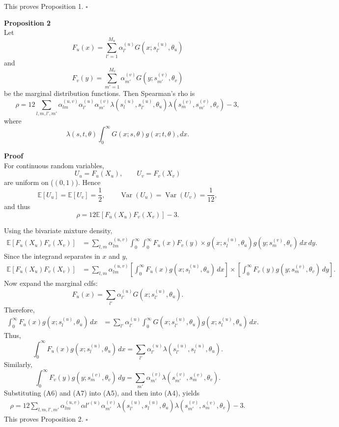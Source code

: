 \documentclass[11pt]{article}
\begin{document}
This proves Proposition 1. $\square$

\textbf{Proposition 2}\\

Let 
\[ F_u(x) = \sum_{l'=1}^{M_u}\alpha_{l'}^{(u)} G(x;s_{l'}^{(u)},\theta_u) \] and 
\[ F_v(y)=\sum_{m'=1}^{M_v}\alpha_{m'}^{(v)} G(y;s_{m'}^{(v)},\theta_v) \] be the marginal distribution functions. 
Then Spearman’s rho is 
\[ \rho =
12 \sum_{l,m,l',m'} \alpha^{(u,v)}_{lm} \alpha_{l'}^{(u)} \alpha_{m'}^{(v)} \lambda(s_l^{(u)},s_{l'}^{(u)},\theta_u) \lambda(s_m^{(v)},s_{m'}^{(v)},\theta_v) -3, \] where 
\[ \lambda(s,t,\theta)
\int_0^\infty G(x;s,\theta)g(x;t,\theta),dx.
\]

\textbf{Proof}\\
For continuous random variables, 
\[ U_u=F_u(X_u),\qquad U_v=F_v(X_v) 
\] 
are uniform on ($(0,1)$). Hence 
\[ \mathbb E[U_u]=\mathbb E[U_v]=\frac12, \qquad \operatorname{Var}(U_u)=\operatorname{Var}(U_v)=\frac1{12}, \] and thus 
\[ \rho =
12\mathbb E[F_u(X_u)F_v(X_v)]-3.
\tag{A4}
\]

Using the bivariate mixture density,
\[
\begin{aligned}
\mathbb E[F_u(X_u)F_v(X_v)]
&=
\sum_{l,m}\alpha^{(u,v)}_{lm}
\int_0^\infty\int_0^\infty
F_u(x)F_v(y) \times
g(x;s_l^{(u)},\theta_u)
g(y;s_m^{(v)},\theta_v)\,dx\,dy.
\end{aligned}
\]
Since the integrand separates in $x$ and $y$,
\[
\begin{aligned}
\mathbb E[F_u(X_u)F_v(X_v)]
&=
\sum_{l,m}\alpha^{(u,v)}_{lm}
\left[
\int_0^\infty F_u(x)g(x;s_l^{(u)},\theta_u)\,dx
\right]\times
\left[
\int_0^\infty F_v(y)g(y;s_m^{(v)},\theta_v)\,dy
\right].
\end{aligned}
\tag{A5}
\]
Now expand the marginal cdfs: 
\[ F_u(x) =
\sum_{l'}\alpha_{l'}^{(u)} G(x;s_{l'}^{(u)},\theta_u). \] 
Therefore, 
\[ \begin{aligned} \int_0^\infty F_u(x)g(x;s_l^{(u)},\theta_u)\,dx &= \sum_{l'}\alpha_{l'}^{(u)} \int_0^\infty G(x;s_{l'}^{(u)},\theta_u) g(x;s_l^{(u)},\theta_u)\,dx. \end{aligned} \] 
Thus, 
\[ \int_0^\infty F_u(x)g(x;s_l^{(u)},\theta_u)\,dx = \sum_{l'}\alpha_{l'}^{(u)} \lambda(s_{l'}^{(u)},s_l^{(u)},\theta_u). \tag{A6} \] 
Similarly, 
\[ \int_0^\infty F_v(y)g(y;s_m^{(v)},\theta_v)\,dy = \sum_{m'}\alpha_{m'}^{(v)}\lambda(s_{m'}^{(v)},s_m^{(v)},\theta_v).
\tag{A7}
\]
Substituting (A6) and (A7) into (A5), and then into (A4), yields 
\[ \begin{aligned} \rho =
12 \sum_{l,m,l',m'} \alpha^{(u,v)}_{lm} \alpha{l'}^{(u)} \alpha_{m'}^{(v)} \lambda(s_{l'}^{(u)},s_l^{(u)},\theta_u) \lambda(s_{m'}^{(v)},s_m^{(v)},\theta_v) -3. \end{aligned} \] 
This proves Proposition 2. $\square$
\newline		
\end{document}
